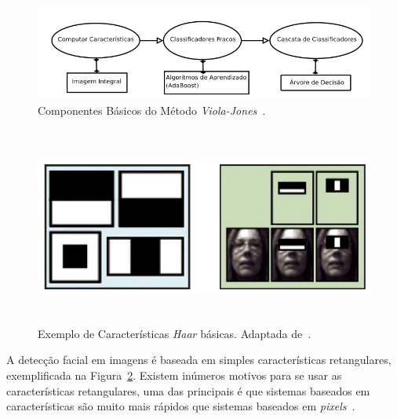 	\begin{figure}[H]
		\begin{center}
			\includegraphics[scale=0.5]{figuras/2.FundamentacaoTeorica/edsonma.png}
		\end{center}
		\caption{Componentes Básicos do Método \textit{Viola-Jones}~\cite{edsonma}.}
		\label{fig:edsonma}
	\end{figure}

	\begin{figure}[H]
		\begin{center}
			\includegraphics[height=6.5cm,width=12.5cm]{figuras/2.FundamentacaoTeorica/haar_features.png}
		\end{center}
		\caption{Exemplo de Características \textit{Haar} básicas. Adaptada de~\cite{servodetection}.}
		\label{haarfeatures}
	\end{figure}

	A detecção facial em imagens é baseada em simples características retangulares,
	exemplificada na Figura~\ref{haarfeatures}. Existem inúmeros motivos para se
	usar as características retangulares, uma das principais é que sistemas
	baseados em características são muito mais rápidos que sistemas baseados em
	\textit{pixels}~\cite{violajones}.

